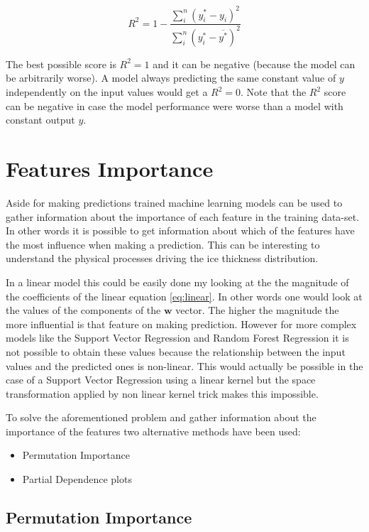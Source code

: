 \begin{equation}\label{eq:score}
R^2 = 1 - \frac{\sum_{i}^{n}(y^*_i-y_i)^2}{\sum_{i}^{n}(y^*_i-\overline{y^*})^2}
\end{equation}

The best possible score is $R^2 = 1$ and it can be negative (because the model can be arbitrarily worse). A model always predicting the same constant value of $y$ independently on the input values would get a $R^2 = 0$. Note that the $R^2$ score can be negative in case the model performance were worse than a model with constant output $y$.

\section{Features Importance}\label{featuresimp}
Aside for making predictions trained machine learning models can be used to gather information about the importance of each feature in the training data-set. In other words it is possible to get information about which of the features have the most influence when making a prediction. This can be interesting to understand the physical processes driving the ice thickness distribution.

In a linear model this could be easily done my looking at the the magnitude of the coefficients of the linear equation \ref{eq:linear}. In other words one would look at the values of the components of the $\mathbf{w}$ vector. The higher the magnitude the more influential is that feature on making prediction.
However for more complex models like the Support Vector Regression and Random Forest Regression it is not possible to obtain these values because the relationship between the input values and the predicted ones is non-linear. This would actually be possible in the case of a Support Vector Regression using a linear kernel but the space transformation applied by non linear kernel trick makes this impossible.

To solve the aforementioned problem and gather information about the importance of the features two alternative methods have been used:
\begin{itemize}
	\item Permutation Importance
	\item Partial Dependence plots
\end{itemize} 

\subsection{Permutation Importance}

